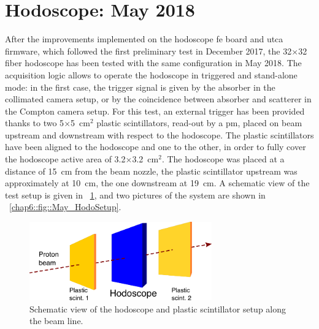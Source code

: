 \section{Hodoscope: May 2018}\label{chap6::sec::may2018}
After the improvements implemented on the hodoscope \gls{fe} board and \gls{utca} firmware, which followed the first preliminary test in December 2017, the 32$\times$32 fiber hodoscope has been tested with the same configuration in May 2018. The acquisition logic allows to operate the hodoscope in triggered and stand-alone mode: in the first case, the trigger signal is given by the absorber in the collimated camera setup, or by the coincidence between absorber and scatterer in the Compton camera setup. For this test, an external trigger has been provided thanks to two 5$\times$5~cm$^2$ plastic scintillators, read-out by a \gls{pm}, placed on beam upstream and downstream with respect to the hodoscope. The plastic scintillators have been aligned to the hodoscope and one to the other, in order to fully cover the hodoscope active area of 3.2$\times$3.2~cm$^2$. The hodoscope was placed at a distance of 15~cm from the beam nozzle, the plastic scintillator upstream was approximately at 10~cm, the one downstream at 19~cm. A schematic view of the test setup is given in \figurename~\ref{chap6::fig::May_HodoDAQscheme}, and two pictures of the system are shown in \figurename~\ref{chap6::fig::May_HodoSetup}. 


\begin{figure}[!htbp]
\centering
\includegraphics[width=0.7\textwidth]{03_GraphicFiles/chapter6_BeamTests/Nice_May2018/scheme.png}
\caption{Schematic view of the hodoscope and plastic scintillator setup along the beam line.}
\label{chap6::fig::May_HodoDAQscheme}
\end{figure}

